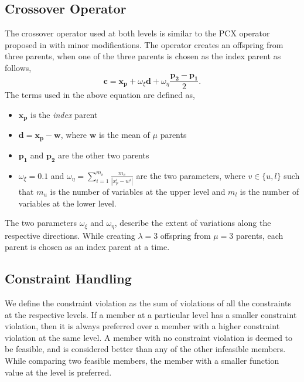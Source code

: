 \documentclass[twoside]{article}
\begin{document}
\subsection{Crossover Operator}
\label{sec:crossover}
The crossover operator used at both levels is similar to the PCX operator proposed in \cite{my-cec06} with minor modifications. The operator creates an offspring from three parents, when one of the three parents is chosen as the index parent as follows,
\begin{equation}
\mathbf{c} = \mathbf{x_p} + \omega_{\xi}\mathbf{d} + \omega_{\eta}\frac{\mathbf{p_2}-\mathbf{p_1}}{2}.
\label{eq:child}
\end{equation}
The terms used in the above equation are defined as,
\begin{itemize}\itemsep1pt \parskip0pt 
	\item $\mathbf{x_p}$ is the {\em index\/} parent
	\item $\mathbf{d}=\mathbf{x_{p}}-\mathbf{w}$, where $\mathbf{w}$ is the mean of $\mu$ parents
	\item $\mathbf{p_1}$ and $\mathbf{p_2}$ are the other two parents
	\item $\omega_{\xi}=0.1$ and $\omega_{\eta}=\sum_{i=1}^{m_v} \frac{m_v}{|x_{p}^{i}-w^{i}|}$ are the two parameters, where $v \in \{u,l\}$ such that $m_u$ is the number of variables at the upper level and $m_l$ is the number of variables at the lower level.
\end{itemize}
The two parameters $\omega_{\xi}$ and $\omega_{\eta}$, describe the extent of variations along the respective directions. While creating $\lambda=3$ offspring from $\mu=3$ parents, each parent is chosen as an index parent at a time.

\subsection{Constraint Handling}
We define the constraint violation as the sum of violations of all the constraints at the respective levels. If a member at a particular level has a smaller constraint violation, then it is always preferred over a member with a higher constraint violation at the same level. A member with no constraint violation is deemed to be feasible, and is considered better than any of the other infeasible members. While comparing two feasible members, the member with a smaller function value at the level is preferred.
\end{document}
